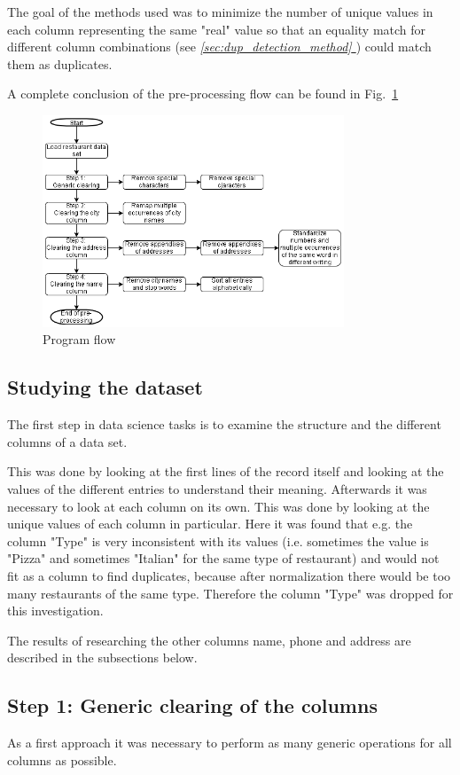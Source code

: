 \documentclass[conference]{IEEEtran}
\newcommand*{\fullref}[1]{\textit{\hyperref[{#1}]{\autoref*{#1} \nameref*{#1}}}}
\begin{document}
The goal of the methods used was to minimize the number of unique values in each column representing the same "real" value so that an equality match for different column combinations (see \fullref{sec:dup_detection_method}) could match them as duplicates.

A complete conclusion of the pre-processing flow can be found in Fig.~\ref{fig:program_flow}
\begin{figure}[htbp]
	\centerline{\includegraphics[width=9cm]{figures/program_flow.png}}
	\caption{Program flow}
	\label{fig:program_flow}
\end{figure}
\subsection{Studying the dataset}
The first step in data science tasks is to examine the structure and the different columns of a data set. 

This was done by looking at the first lines of the record itself and looking at the values of the different entries to understand their meaning. Afterwards it was necessary to look at each column on its own. This was done by looking at the unique values of each column in particular. Here it was found that e.g. the column "Type" is very inconsistent with its values (i.e. sometimes the value is "Pizza" and sometimes "Italian" for the same type of restaurant) and would not fit as a column to find duplicates, because after normalization there would be too many restaurants of the same type. Therefore the column "Type" was dropped for this investigation.

The results of researching the other columns name, phone and address are described in the subsections below.
\subsection{Step 1: Generic clearing of the columns}
As a first approach it was necessary to perform as many generic operations for all columns as possible. 
\end{document}
